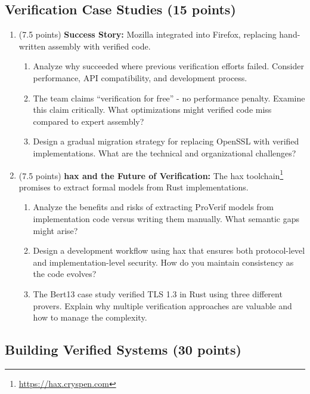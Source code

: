 \documentclass[10pt,a4paper,american]{exam}
\begin{document}
\subsection{Verification Case Studies (15 points)}

\begin{enumerate}
	\item (7.5 points) \textbf{\haclstar Success Story:}
	      Mozilla integrated \haclstar into Firefox, replacing hand-written assembly with verified \fstar code.
	      \begin{enumerate}
		      \item Analyze why \haclstar succeeded where previous verification efforts failed. Consider performance, API compatibility, and development process.
		      \item The \haclstar team claims ``verification for free'' - no performance penalty. Examine this claim critically. What optimizations might verified code miss compared to expert assembly?
		      \item Design a gradual migration strategy for replacing OpenSSL with verified implementations. What are the technical and organizational challenges?
	      \end{enumerate}

	\item (7.5 points) \textbf{hax and the Future of Verification:}
	      The hax toolchain\footnote{\url{https://hax.cryspen.com}} promises to extract formal models from Rust implementations.
	      \begin{enumerate}
		      \item Analyze the benefits and risks of extracting ProVerif models from implementation code versus writing them manually. What semantic gaps might arise?
		      \item Design a development workflow using hax that ensures both protocol-level and implementation-level security. How do you maintain consistency as the code evolves?
		      \item The Bert13 case study verified TLS 1.3 in Rust using three different provers. Explain why multiple verification approaches are valuable and how to manage the complexity.
	      \end{enumerate}
\end{enumerate}

\subsection{Building Verified Systems (30 points)}
\end{document}
